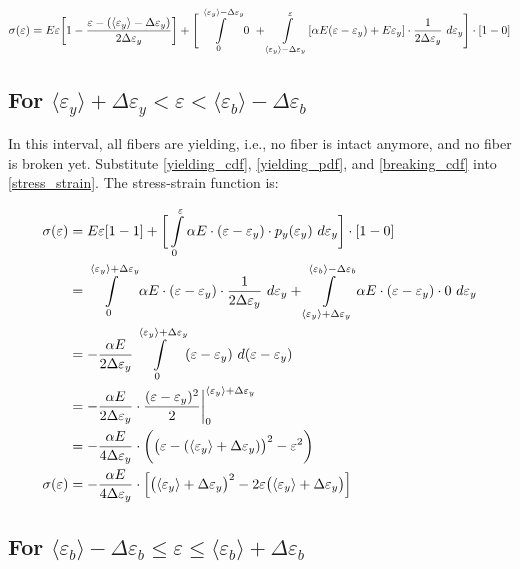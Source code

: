 \documentclass{article}
\newcommand{\eps}{\varepsilon}
\newcommand{\avg}[1]{\langle #1 \rangle}
\newcommand{\ey}{\avg{\eps_y}}
\newcommand{\dey}{\Delta \varepsilon_y}
\newcommand{\deb}{\Delta \varepsilon_b}
\begin{document}
\begin{align}
    \notag
    \sigma(\eps) &= E \eps \bigg[1 - \frac{\eps - (\ey - \dey)}{2 \dey} \bigg] + \Bigg[\int\limits_0^{\ey - \dey} 0 ~+ \int\limits_{\ey - \dey}^\eps [\alpha E (\eps - \eps_y) + E \eps_y] \cdot \frac{1}{2 \dey} ~ d\eps_y \Bigg]\cdot [1 - 0] \\
    
\end{align}


\subsection{For $\avg{\eps_y} + \dey < \eps < \avg{\eps_b} - \deb$}

\indent
In this interval, all fibers are yielding, i.e., no fiber is intact anymore, and no fiber is broken yet. Substitute \eqref{yielding_cdf}, \eqref{yielding_pdf}, and \eqref{breaking_cdf} into \eqref{stress_strain}. The stress-strain function is:

\begin{align}
    \notag
    \sigma(\eps) &= E \eps [ 1 - 1 ] + \bigg[\int\limits_0^\eps \alpha E \cdot (\eps - \eps_y) \cdot p_y(\eps_y) ~ d\eps_y \bigg] \cdot [1 - 0] \\
    \notag
    &= \int\limits_0^{\avg{\eps_y} + \dey} \alpha E \cdot (\eps - \eps_y) \cdot \frac{1}{2 \dey} ~ d\eps_y + \int\limits_{\avg{\eps_y} + \dey}^{\avg{\eps_b} - \deb} \alpha E \cdot (\eps - \eps_y) \cdot 0 ~ d\eps_y  \\
    \notag
    &= - \frac{\alpha E}{2 \dey} \int\limits_0^{\avg{\eps_y} + \dey} (\eps - \eps_y) ~ d(\eps - \eps_y) \\
    \notag
    &= - \frac{\alpha E}{2 \dey} \cdot \frac{(\eps - \eps_y)^2}{2} \bigg|_0^{\avg{\eps_y} + \dey} \\
    \notag
    &= - \frac{\alpha E}{4 \dey} \cdot \bigg( \bigl( \eps - (\avg{\eps_y} + \dey)\bigr) ^2 - \eps^2 \bigg) \\
    \sigma(\eps) &= - \frac{\alpha E}{4 \dey} \cdot \Bigl[ \bigl( \avg{\eps_y} + \dey \bigr)^2 - 2\eps \bigl( \avg{\eps_y} + \dey \bigr) \Bigr]
\end{align}


\subsection{For $\avg{\eps_b} - \deb \leq \eps \leq \avg{\eps_b} + \deb$}
\end{document}
